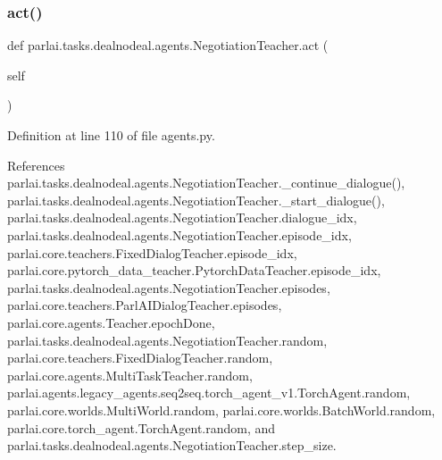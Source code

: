 \subsubsection{\texorpdfstring{act()}{act()}}
{\footnotesize\ttfamily def parlai.\+tasks.\+dealnodeal.\+agents.\+Negotiation\+Teacher.\+act (\begin{DoxyParamCaption}\item[{}]{self }\end{DoxyParamCaption})}



Definition at line 110 of file agents.\+py.



References parlai.\+tasks.\+dealnodeal.\+agents.\+Negotiation\+Teacher.\+\_\+continue\+\_\+dialogue(), parlai.\+tasks.\+dealnodeal.\+agents.\+Negotiation\+Teacher.\+\_\+start\+\_\+dialogue(), parlai.\+tasks.\+dealnodeal.\+agents.\+Negotiation\+Teacher.\+dialogue\+\_\+idx, parlai.\+tasks.\+dealnodeal.\+agents.\+Negotiation\+Teacher.\+episode\+\_\+idx, parlai.\+core.\+teachers.\+Fixed\+Dialog\+Teacher.\+episode\+\_\+idx, parlai.\+core.\+pytorch\+\_\+data\+\_\+teacher.\+Pytorch\+Data\+Teacher.\+episode\+\_\+idx, parlai.\+tasks.\+dealnodeal.\+agents.\+Negotiation\+Teacher.\+episodes, parlai.\+core.\+teachers.\+Parl\+A\+I\+Dialog\+Teacher.\+episodes, parlai.\+core.\+agents.\+Teacher.\+epoch\+Done, parlai.\+tasks.\+dealnodeal.\+agents.\+Negotiation\+Teacher.\+random, parlai.\+core.\+teachers.\+Fixed\+Dialog\+Teacher.\+random, parlai.\+core.\+agents.\+Multi\+Task\+Teacher.\+random, parlai.\+agents.\+legacy\+\_\+agents.\+seq2seq.\+torch\+\_\+agent\+\_\+v1.\+Torch\+Agent.\+random, parlai.\+core.\+worlds.\+Multi\+World.\+random, parlai.\+core.\+worlds.\+Batch\+World.\+random, parlai.\+core.\+torch\+\_\+agent.\+Torch\+Agent.\+random, and parlai.\+tasks.\+dealnodeal.\+agents.\+Negotiation\+Teacher.\+step\+\_\+size.

